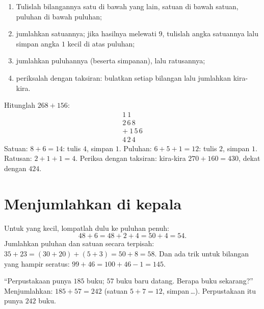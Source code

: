 \begin{method}\label{met:g2:addition:column}
\begin{enumerate}
  \item Tulislah bilangannya satu di bawah yang lain, satuan di bawah
        satuan, puluhan di bawah puluhan;
  \item jumlahkan satuannya; jika hasilnya melewati $9$, tulislah
        angka satuannya lalu simpan angka $1$ kecil di atas puluhan;
  \item jumlahkan puluhannya (beserta simpanan), lalu ratusannya;
  \item periksalah dengan taksiran: bulatkan setiap bilangan lalu
        jumlahkan kira-kira.
\end{enumerate}
\end{method}

\begin{example}\label{ex:g2:addition:worked}
Hitunglah $268 + 156$:
\[
\begin{array}{r}
{\scriptstyle 1}\ {\scriptstyle 1}\ \phantom{0} \\[-3pt]
2\,6\,8 \\
+\ 1\,5\,6 \\
\hline
4\,2\,4
\end{array}
\]
Satuan: $8 + 6 = 14$: tulis $4$, simpan $1$. Puluhan:
$6 + 5 + 1 = 12$: tulis $2$, simpan $1$. Ratusan:
$2 + 1 + 1 = 4$. Periksa dengan taksiran: kira-kira
$270 + 160 = 430$, dekat dengan $424$. \checkmark
\end{example}

\section{Menjumlahkan di kepala}

\begin{example}\label{ex:g2:addition:mental}
Untuk  yang kecil, lompatlah dulu ke puluhan penuh:
\[
48 + 6 = 48 + 2 + 4 = 50 + 4 = 54 .
\]
Jumlahkan puluhan dan satuan secara terpisah:
$35 + 23 = (30 + 20) + (5 + 3) = 50 + 8 = 58$. Dan ada trik untuk
bilangan yang hampir seratus: $99 + 46 = 100 + 46 - 1 = 145$.
\end{example}

\begin{example}\label{ex:g2:addition:problem}
``Perpustakaan punya $185$ buku; $57$ buku baru datang. Berapa buku
sekarang?'' Menjumlahkan: $185 + 57 = 242$ (satuan $5 + 7 = 12$,
simpan\,\dots). Perpustakaan itu punya $242$ buku.
\end{example}

